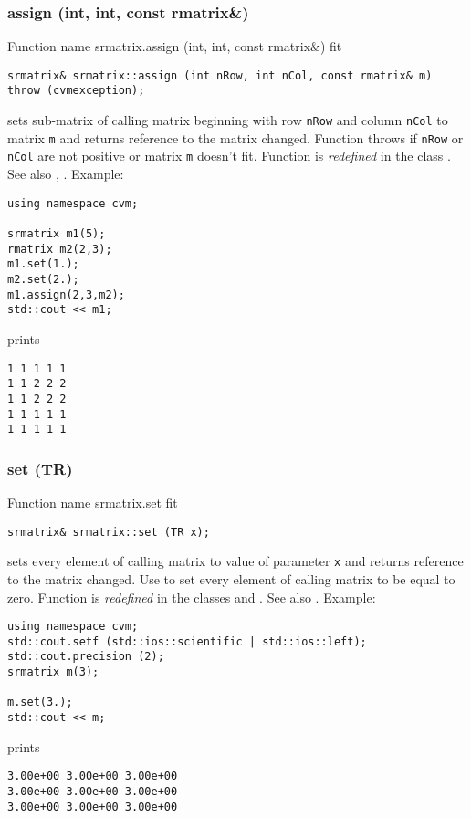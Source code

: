 \subsubsection{assign (int, int, const rmatrix\&)}
Function%
\pdfdest name {srmatrix.assign (int, int, const rmatrix&)} fit
\begin{verbatim}
srmatrix& srmatrix::assign (int nRow, int nCol, const rmatrix& m)
throw (cvmexception);
\end{verbatim}
sets sub-matrix of  calling matrix beginning with \Based row
\verb"nRow" and column \verb"nCol" to  matrix \verb"m" and
returns  reference to the matrix changed. Function throws 
  if \verb"nRow"
or \verb"nCol" are not positive or matrix \verb"m" doesn't fit.
Function is \emph{redefined} in the class
.
See also , .
Example:
\begin{Verbatim}
using namespace cvm;

srmatrix m1(5);
rmatrix m2(2,3);
m1.set(1.);
m2.set(2.);
m1.assign(2,3,m2);
std::cout << m1;
\end{Verbatim}
prints
\begin{Verbatim}
1 1 1 1 1
1 1 2 2 2
1 1 2 2 2
1 1 1 1 1
1 1 1 1 1
\end{Verbatim}
\newpage





\subsubsection{set (TR)}
Function%
\pdfdest name {srmatrix.set} fit
\begin{verbatim}
srmatrix& srmatrix::set (TR x);
\end{verbatim}
sets every element of  calling matrix to value of
parameter \verb"x" and returns  reference to
the matrix changed.
Use  to set every element
of  calling matrix to be equal to zero.
Function is \emph{redefined} in the classes
and .
See also .
Example:
\begin{Verbatim}
using namespace cvm;
std::cout.setf (std::ios::scientific | std::ios::left); 
std::cout.precision (2);
srmatrix m(3);

m.set(3.);
std::cout << m;
\end{Verbatim}
prints
\begin{Verbatim}
3.00e+00 3.00e+00 3.00e+00
3.00e+00 3.00e+00 3.00e+00
3.00e+00 3.00e+00 3.00e+00
\end{Verbatim}
\newpage



